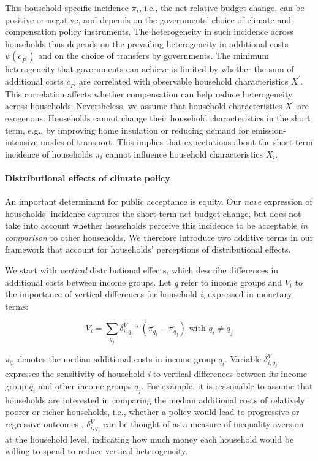 \documentclass[12pt, a4paper]{article}
\begin{document}
This household-specific incidence $\pi_{i}$, i.e., the net relative budget change, can be positive or negative, and depends on the governments' choice of climate and compensation policy instruments. The heterogeneity in such incidence across households thus depends on the prevailing heterogeneity in additional costs $\psi(c_{P^{\prime}})$ and on the choice of transfers by governments. The minimum heterogeneity that governments can achieve is limited by whether the sum of additional costs $c_{P^{\prime}}$ are correlated with observable household characteristics $X^{\prime}$. This correlation affects whether compensation can help reduce heterogeneity across households. Nevertheless, we assume that household characteristics $X^{\prime}$ are exogenous: Households cannot change their household characteristics in the short term, e.g., by improving home insulation or reducing demand for emission-intensive modes of transport. This implies that expectations about the short-term incidence of households $\pi_{i}$ cannot influence household characteristics $X_{i}$.

\paragraph{Distributional effects of climate policy}
An important determinant for public acceptance is equity. Our \textit{nave} expression of households' incidence captures the short-term net budget change, but does not take into account whether households perceive this incidence to be acceptable \textit{in comparison} to other households. We therefore introduce two additive terms in our framework that account for households' perceptions of distributional effects. 

We start with \textit{vertical} distributional effects, which describe differences in additional costs between income groups. Let \textit{q} refer to income groups and $V_{i}$ to the importance of vertical differences for household \textit{i}, expressed in monetary terms:

\begin{equation}\label{eq_V}
    V_{i} = \sum_{q_{j}} \delta_{i,q_{j}}^{V} * (\overline{\pi_{q_{i}}}-\overline{\pi_{q_{j}}}) \text{ with } q_{i} \neq q_{j}  
\end{equation}

$\overline{\pi_{q_{i}}}$ denotes the median additional costs in income group $q_{i}$. Variable $\delta_{i,q_{j}}^{V}$ expresses the sensitivity of household \textit{i} to vertical differences between its income group $q_{i}$ and other income groups $q_{j}$. For example, it is reasonable to assume that households are interested in comparing the median additional costs of relatively poorer or richer households, i.e., whether a policy would lead to progressive or regressive outcomes \autocite[e.g.,][]{Dechezlepretre.2022}. $\delta_{i,q_{j}}^{V}$ can be thought of as a measure of inequality aversion at the household level, indicating how much money each household would be willing to spend to reduce vertical heterogeneity.
\end{document}
